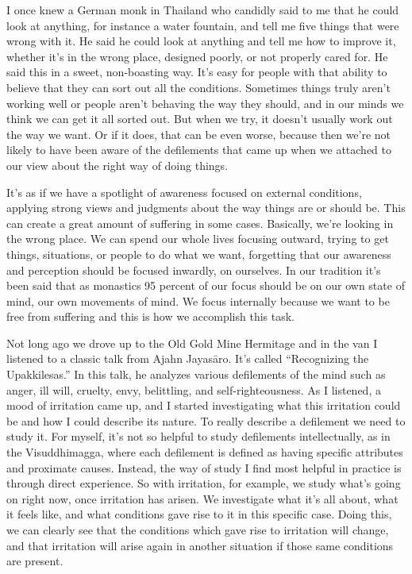 I once knew a German monk in Thailand who candidly said to me that he 
could look at anything, for instance a water fountain, and tell me five 
things that were wrong with it. He said he could look at anything and 
tell me how to improve it, whether it's in the wrong place, designed 
poorly, or not properly cared for. He said this in a sweet, 
non-boasting way. It's easy for people with that ability to believe 
that they can sort out all the conditions. Sometimes things truly 
aren't working well or people aren't behaving the way they should, and 
in our minds we think we can get it all sorted out. But when we try, it 
doesn't usually work out the way we want. Or if it does, that can be 
even worse, because then we're not likely to have been aware of the 
defilements that came up when we attached to our view about the right 
way of doing things.

It's as if we have a spotlight of awareness focused on external 
conditions, applying strong views and judgments about the way things 
are or should be. This can create a great amount of suffering in some 
cases. Basically, we're looking in the wrong place. We can spend our 
whole lives focusing outward, trying to get things, situations, or 
people to do what we want, forgetting that our awareness and perception 
should be focused inwardly, on ourselves. In our tradition it's been 
said that as monastics 95 percent of our focus should be on our own 
state of mind, our own movements of mind. We focus internally because 
we want to be free from suffering and this is how we accomplish this 
task.

Not long ago we drove up to the Old Gold Mine Hermitage and in the van I
listened to a classic talk from Ajahn Jayasāro. It's called
``Recognizing the Upakkilesas.'' In this talk, he analyzes various
defilements of the mind such as anger, ill will, cruelty, envy,
belittling, and self-righteousness. As I listened, a mood of irritation
came up, and I started investigating what this irritation could be and
how I could describe its nature. To really describe a defilement we need
to study it. For myself, it's not so helpful to study defilements
intellectually, as in the Visuddhimagga, where each defilement is
defined as having specific attributes and proximate causes. Instead, the
way of study I find most helpful in practice is through direct
experience. So with irritation, for example, we study what's going on
right now, once irritation has arisen. We investigate what it's all
about, what it feels like, and what conditions gave rise to it in this
specific case. Doing this, we can clearly see that the conditions which
gave rise to irritation will change, and that \mbox{irritation} will
arise again in another situation if those same conditions are present.

